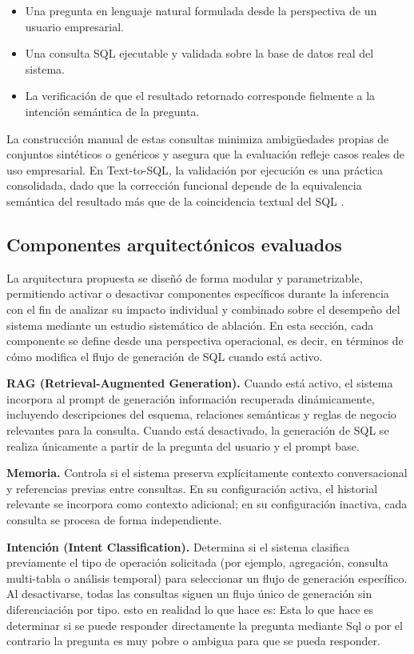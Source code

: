 \documentclass[journal]{IEEEtran}
\begin{document}
\begin{itemize}
	\item Una pregunta en lenguaje natural formulada desde la perspectiva de un usuario empresarial.
	\item Una consulta SQL ejecutable y validada sobre la base de datos real del sistema.
	\item La verificación de que el resultado retornado corresponde fielmente a la intención semántica de la pregunta.
\end{itemize}

La construcción manual de estas consultas minimiza ambigüedades propias de conjuntos sintéticos o genéricos y asegura que la evaluación refleje casos reales de uso empresarial. En Text-to-SQL, la validación por ejecución es una práctica consolidada, dado que la corrección funcional depende de la equivalencia semántica del resultado más que de la coincidencia textual del SQL \cite{scholak2021picard, hong2024bird}.

\subsection{Componentes arquitectónicos evaluados}

La arquitectura propuesta se diseñó de forma modular y parametrizable, permitiendo activar o desactivar componentes específicos durante la inferencia con el fin de analizar su impacto individual y combinado sobre el desempeño del sistema mediante un estudio sistemático de ablación. En esta sección, cada componente se define desde una perspectiva operacional, es decir, en términos de cómo modifica el flujo de generación de SQL cuando está activo.

\textbf{RAG (Retrieval-Augmented Generation).} Cuando está activo, el sistema incorpora al prompt de generación información recuperada dinámicamente, incluyendo descripciones del esquema, relaciones semánticas y reglas de negocio relevantes para la consulta. Cuando está desactivado, la generación de SQL se realiza únicamente a partir de la pregunta del usuario y el prompt base.

\textbf{Memoria.} Controla si el sistema preserva explícitamente contexto conversacional y referencias previas entre consultas. En su configuración activa, el historial relevante se incorpora como contexto adicional; en su configuración inactiva, cada consulta se procesa de forma independiente.

\textbf{Intención (Intent Classification).} Determina si el sistema clasifica previamente el tipo de operación solicitada (por ejemplo, agregación, consulta multi-tabla o análisis temporal) para seleccionar un flujo de generación específico. Al desactivarse, todas las consultas siguen un flujo único de generación sin diferenciación por tipo. esto en realidad lo que hace es: Esta lo que hace es determinar si se puede responder directamente la pregunta mediante Sql o por el contrario la pregunta es muy pobre o ambigua para que se pueda responder.
\end{document}
